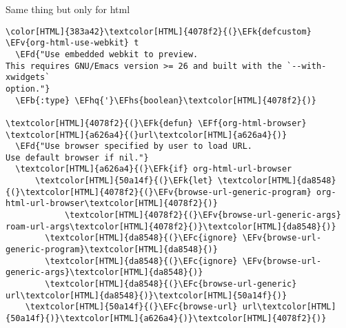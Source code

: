 \documentclass{scrartcl}
\newcommand{\EFk}[1]{\textcolor{EFk}{#1}} %
\newcommand{\EFd}[1]{\textcolor{EFd}{\textit{#1}}} %
\newcommand{\EFb}[1]{\textcolor{EFb}{#1}} %
\newcommand{\EFc}[1]{\textcolor{EFc}{#1}} %
\newcommand{\EFv}[1]{\textcolor{EFv}{#1}} %
\newcommand{\EFf}[1]{\textcolor{EFf}{#1}} %
\newcommand{\EFhq}[1]{\textcolor{EFhq}{#1}} %
\newcommand{\EFhs}[1]{\textcolor{EFhs}{#1}} %
\begin{document}
Same thing but only for html
\begin{Code}
\begin{Verbatim}[]
\color[HTML]{383a42}\textcolor[HTML]{4078f2}{(}\EFk{defcustom} \EFv{org-html-use-webkit} t
  \EFd{"Use embedded webkit to preview.
This requires GNU/Emacs version >= 26 and built with the `--with-xwidgets`
option."}
  \EFb{:type} \EFhq{'}\EFhs{boolean}\textcolor[HTML]{4078f2}{)}

\textcolor[HTML]{4078f2}{(}\EFk{defun} \EFf{org-html-browser} \textcolor[HTML]{a626a4}{(}url\textcolor[HTML]{a626a4}{)}
  \EFd{"Use browser specified by user to load URL.
Use default browser if nil."}
  \textcolor[HTML]{a626a4}{(}\EFk{if} org-html-url-browser
      \textcolor[HTML]{50a14f}{(}\EFk{let} \textcolor[HTML]{da8548}{(}\textcolor[HTML]{4078f2}{(}\EFv{browse-url-generic-program} org-html-url-browser\textcolor[HTML]{4078f2}{)}
            \textcolor[HTML]{4078f2}{(}\EFv{browse-url-generic-args} roam-url-args\textcolor[HTML]{4078f2}{)}\textcolor[HTML]{da8548}{)}
        \textcolor[HTML]{da8548}{(}\EFc{ignore} \EFv{browse-url-generic-program}\textcolor[HTML]{da8548}{)}
        \textcolor[HTML]{da8548}{(}\EFc{ignore} \EFv{browse-url-generic-args}\textcolor[HTML]{da8548}{)}
        \textcolor[HTML]{da8548}{(}\EFc{browse-url-generic} url\textcolor[HTML]{da8548}{)}\textcolor[HTML]{50a14f}{)}
    \textcolor[HTML]{50a14f}{(}\EFc{browse-url} url\textcolor[HTML]{50a14f}{)}\textcolor[HTML]{a626a4}{)}\textcolor[HTML]{4078f2}{)}


\end{Verbatim}
\end{Code}
\end{document}
